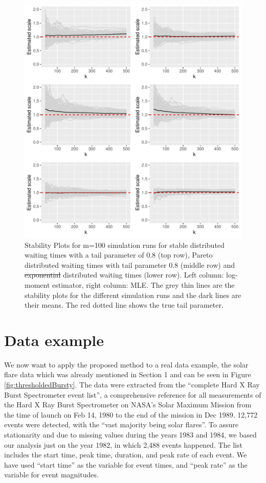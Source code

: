 \documentclass[]{elsarticle} %
\providecommand{\DIFaddtex}[1]{{\protect\color{blue}\uwave{#1}}} %
\providecommand{\DIFdeltex}[1]{{\protect\color{red}\sout{#1}}}                      %
\providecommand{\DIFaddFL}[1]{\DIFadd{#1}} %
\providecommand{\DIFdelFL}[1]{\DIFdel{#1}} %
\providecommand{\DIFaddbeginFL}{} %
\providecommand{\DIFaddendFL}{} %
\providecommand{\DIFdelbeginFL}{} %
\providecommand{\DIFdelendFL}{} %
\providecommand{\DIFadd}[1]{\texorpdfstring{\DIFaddtex{#1}}{#1}} %
\providecommand{\DIFdel}[1]{\texorpdfstring{\DIFdeltex{#1}}{}} %
\newcommand{\DIFscaledelfig}{0.5}
\newlength{\DIFdelgraphicswidth} %
\newlength{\DIFdelgraphicsheight} %
\newcommand{\DIFaddincludegraphics}[2][]{{\color{blue}\fbox{\DIFOincludegraphics[#1]{#2}}}} %
\newcommand{\DIFdelincludegraphics}[2][]{%
\sbox{\DIFdelgraphicsbox}{\DIFOincludegraphics[#1]{#2}}%
\settoboxwidth{\DIFdelgraphicswidth}{\DIFdelgraphicsbox} %
\settoboxtotalheight{\DIFdelgraphicsheight}{\DIFdelgraphicsbox} %
\scalebox{\DIFscaledelfig}{%
\parbox[b]{\DIFdelgraphicswidth}{\usebox{\DIFdelgraphicsbox}\\[-\baselineskip] \rule{\DIFdelgraphicswidth}{0em}}\llap{\resizebox{\DIFdelgraphicswidth}{\DIFdelgraphicsheight}{%
\setlength{\unitlength}{\DIFdelgraphicswidth}%
\begin{picture}(1,1)%
\thicklines\linethickness{2pt} %
{\color[rgb]{1,0,0}\put(0,0){\framebox(1,1){}}}%
{\color[rgb]{1,0,0}\put(0,0){\line( 1,1){1}}}%
{\color[rgb]{1,0,0}\put(0,1){\line(1,-1){1}}}%
\end{picture}%
}\hspace*{3pt}}} %
} %
\DeclareRobustCommand{\DIFaddbeginFL}{\DIFOaddbeginFL \let\includegraphics\DIFaddincludegraphics} %
\DeclareRobustCommand{\DIFaddendFL}{\DIFOaddendFL \let\includegraphics\DIFOincludegraphics} %
\DeclareRobustCommand{\DIFdelbeginFL}{\DIFOdelbeginFL \let\includegraphics\DIFdelincludegraphics} %
\DeclareRobustCommand{\DIFdelendFL}{\DIFOaddendFL \let\includegraphics\DIFOincludegraphics} %
\begin{document}
\begin{figure}

{\centering \includegraphics[width=0.9\linewidth]{article_springer_files/figure-latex/ScaleSimuplots-1} 

}

\caption{\label{Fig:ScaleSimu} Stability Plots for m=100 simulation runs for stable distributed waiting times with a tail parameter of 0.8 (top row), Pareto distributed waiting times with tail parameter 0.8 (middle row) and \DIFdelbeginFL \DIFdelFL{exponential }\DIFdelendFL \DIFaddbeginFL \DIFaddFL{exponentially }\DIFaddendFL distributed waiting times (lower row). Left column: log-moment estimator, right column: MLE. The grey thin lines are the stability plots for the different simulation runs and the dark lines are their means. The red dotted line shows the true tail parameter.}\label{fig:ScaleSimuplots}
\end{figure}

\hypertarget{data-example}{%
\section{Data example}\label{data-example}}

We now want to apply the proposed method to a real data example, the
solar flare data which was already mentioned in Section 1 and can be
seen in Figure \ref{fig:thresholdedBursty}. The data were extracted from
the ``complete Hard X Ray Burst Spectrometer event list'', a
comprehensive reference for all measurements of the Hard X Ray Burst
Spectrometer on NASA's Solar Maximum Mission from the time of launch on
Feb 14, 1980 to the end of the mission in Dec 1989. 12,772 events were
detected, with the ``vast majority being solar flares''. To assure
stationarity and due to missing values during the years 1983 and 1984,
we based our analysis just on the year 1982, in which 2,488 events
happened. The list includes the start time, peak time, duration, and
peak rate of each event. We have used ``start time'' as the variable for
event times, and ``peak rate'' as the variable for event magnitudes.
\end{document}
